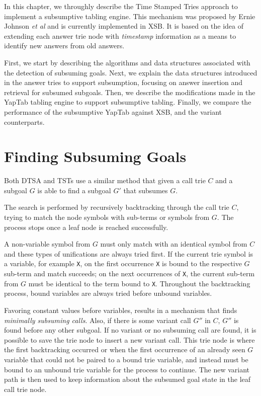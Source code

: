 In this chapter, we throughly describe the Time Stamped Tries approach
to implement a subsumptive tabling engine. This mechanism was proposed by
Ernie Johnson \textit{et al} \cite{Johnson-99} and is currently implemented in XSB.
It is based on the idea of extending each answer trie node with \textit{timestamp}
information as a means to identify new answers from old answers.

First, we start by describing the algorithms and data structures associated
with the detection of subsuming goals. Next, we explain the data structures
introduced in the answer tries to support subsumption, focusing on answer insertion
and retrieval for subsumed subgoals. Then, we describe the modifications made in the YapTab
tabling engine to support subsumptive tabling. Finally, we compare the performance of
the subsumptive YapTab against XSB, and the variant counterparts.

\section{Finding Subsuming Goals}\label{sec:lookup_subsuming}

Both DTSA and TSTs use a similar method that given a call trie $C$ and a subgoal $G$
is able to find a subgoal $G'$ that subsumes $G$.

The search is performed by recursively backtracking through the call trie $C$, trying
to match the node symbols with sub-terms or symbols from $G$. The process stops
once a leaf node is reached successfully.

A non-variable symbol from $G$ must only match with an identical symbol from $C$ and
these types of unifications are always tried first.
If the current trie symbol is a variable, for example \texttt{X}, on the first occurrence \texttt{X}
is bound to the respective $G$ sub-term
and match succeeds; on the next occurrences of \texttt{X}, the current sub-term from $G$ must
be identical to the term bound to \texttt{X}. Throughout the backtracking process, bound variables are
always tried before unbound variables.

Favoring constant values before variables, results in a mechanism that finds \textit{minimally subsuming calls}.
Also, if there is some variant call $G''$ in $C$, $G''$ is found before any other subgoal. If no variant 
or no subsuming call are found, it is possible to save the trie node to insert a new variant call.
This trie node is where the first backtracking occurred or when the first occurrence of
an already seen $G$ variable that could not be paired to a bound trie variable, and instead
must be bound to an unbound trie variable for the process to continue.
The new variant path is then used to keep information about the subsumed goal state in
the leaf call trie node.

